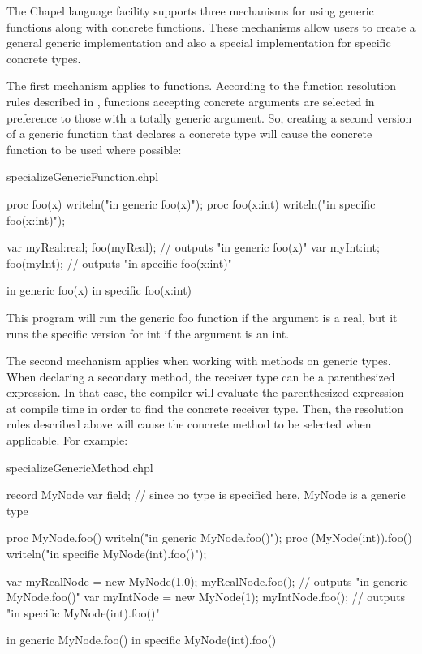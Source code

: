 The Chapel language facility supports three mechanisms for using generic
functions along with concrete functions. These mechanisms allow users to
create a general generic implementation and also a special implementation
for specific concrete types.

The first mechanism applies to functions.
According to the function resolution rules described in
, functions accepting concrete arguments are
selected in preference to those with a totally generic argument. So,
creating a second version of a generic function that declares a concrete
type will cause the concrete function to be used where possible:

\begin{chapelexample}{specializeGenericFunction.chpl}
\begin{chapel}
proc foo(x) {
  writeln("in generic foo(x)");
}
proc foo(x:int) {
  writeln("in specific foo(x:int)");
}

var myReal:real;
foo(myReal); // outputs "in generic foo(x)"
var myInt:int;
foo(myInt); // outputs "in specific foo(x:int)"
\end{chapel}
\begin{chapeloutput}
in generic foo(x)
in specific foo(x:int)
\end{chapeloutput}
\end{chapelexample}

This program will run the generic foo function if the argument is a real,
but it runs the specific version for int if the argument is an int.

The second mechanism applies when working with methods on generic types.
When declaring a secondary method, the receiver type can be a
parenthesized expression. In that case, the compiler will evaluate the
parenthesized expression at compile time in order to find the concrete
receiver type. Then, the resolution rules described above will cause the
concrete method to be selected when applicable. For example:

\begin{chapelexample}{specializeGenericMethod.chpl}
\begin{chapel}

record MyNode {
  var field;  // since no type is specified here, MyNode is a generic type
}

proc MyNode.foo() {
  writeln("in generic MyNode.foo()");
}
proc (MyNode(int)).foo() {
  writeln("in specific MyNode(int).foo()");
}

var myRealNode = new MyNode(1.0);
myRealNode.foo(); // outputs "in generic MyNode.foo()"
var myIntNode = new MyNode(1);
myIntNode.foo(); // outputs "in specific MyNode(int).foo()"
\end{chapel}
\begin{chapeloutput}
in generic MyNode.foo()
in specific MyNode(int).foo()
\end{chapeloutput}
\end{chapelexample}

